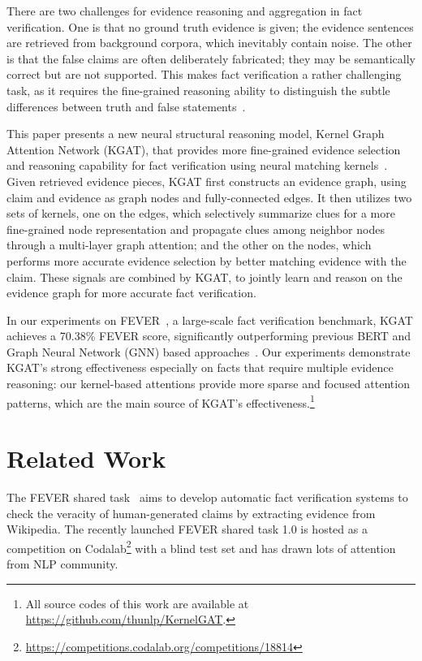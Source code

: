 \documentclass[11pt,a4paper]{article}
\begin{document}
There are two challenges for evidence reasoning and aggregation in fact verification.
One is that no ground truth evidence is given; the evidence sentences are retrieved from background corpora, which inevitably contain noise.
The other is that the false claims are often deliberately fabricated; they may be semantically correct but are not supported.
This makes fact verification a rather challenging task, as it requires the fine-grained reasoning ability to distinguish the subtle differences between truth and false statements~\cite{zhou2019gear}.


This paper presents a new neural structural reasoning model, Kernel Graph Attention Network (KGAT), that provides more fine-grained evidence selection and reasoning capability for fact verification using neural matching kernels~\cite{xiong2017knrm, convknrm}.
Given retrieved evidence pieces, KGAT first constructs an evidence graph, using claim and evidence as graph nodes and fully-connected edges. It then utilizes two sets of kernels, one on the edges, which selectively summarize clues for a more fine-grained node representation and propagate clues among neighbor nodes through a multi-layer graph attention; and the other on the nodes, which performs more accurate evidence selection by better matching evidence with the claim. These signals are combined by KGAT, to jointly learn and reason on the evidence graph for more accurate fact verification.



In our experiments on FEVER~\cite{thorne2018fever}, a large-scale fact verification benchmark, KGAT achieves a 70.38\% FEVER score, significantly outperforming previous BERT and Graph Neural Network (GNN) based approaches~\cite{zhou2019gear}.
Our experiments demonstrate KGAT's strong effectiveness especially on facts that require multiple evidence reasoning: our kernel-based attentions provide more sparse and focused attention patterns, which are the main source of KGAT's effectiveness.\footnote{ All source codes of this work are available at \url{https://github.com/thunlp/KernelGAT}.}

\section{Related Work}
The FEVER shared task~\cite{thorne2018fever} aims to develop automatic fact verification systems to check the veracity of human-generated claims by extracting evidence from Wikipedia. The recently launched FEVER shared task 1.0 is hosted as a competition on Codalab\footnote{\url{https://competitions.codalab.org/competitions/18814}} with a blind test set and has drawn lots of attention from NLP community.
\end{document}
